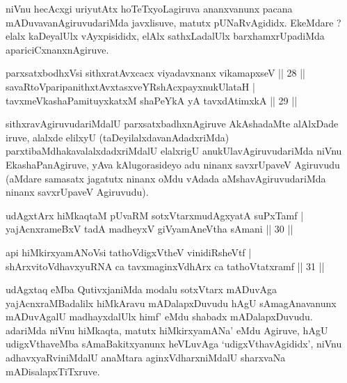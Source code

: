 \begin{artha}
niVnu hecAcxgi uriyutAtx hoTeTxyoLagiruva ananxvanunx pacana mADuvava\-nAgiruvudariMda javxlisuve, matutx pUNaRvAgididx. EkeMdare ? elalx kaDeyalUlx vAyxpisididx, elAlx sathxLadalUlx barxhamxrUpadiMda apariciCxnanxnAgiruve.
\end{artha}


\begin{shl}
parxsatxbodhxV\s si sithxratAvxcacx viyadavxnanx vikamapxseV \hfill|| 28 || \\
savaRtoV\s paripanithxtAvxtasxveYRshAcxpayxnukUlataH | \\
tavxmeVkashaPamituyxkatxM shaPeYkA yA tavxdAtimxkA \hfill|| 29 || 
\end{shl}

\begin{artha}
sithxravAgiruvudariMdalU parxsatxbadhxnAgiruve AkAshadaMte alAlxDade iruve, alalxde elilxyU (taDeyilalxdavanAdadxriMda) parxtibaMdhakavalalxdadxriMdalU elalxrigU anukUlavAgiruvudariMda niVnu EkashaPanAgiruve, yAva kAlugorasideyo adu ninanx savxrUpaveV Agiruvudu (aMdare samasatx jagatutx ninanx oMdu vAdada aMshavAgiruvudariMda ninanx savxrUpaveV Agiruvudu).
\end{artha}

\begin{shl}
udAgxtArx hiMkaqtaM pUvaRM sotxVtarxmudAgxyatA suPxTamf | \\
yajAcnxrameBxV tadA madheyxV giVyamAneV\s tha sAmani \hfill|| 30 || 
\end{shl}

\begin{shl}
api hiMkirxyamANoV\s si tathoVdigxVtheV vinidiRsheVtf | \\
shArxvitoV\s dhavxyuRNA ca tavxmaginxVdhArx ca tathoVtatxramf \hfill|| 31 || 
\end{shl}

\begin{artha}
udAgxtaq eMba QutivxjaniMda modalu sotxVtarx mADuvAga yajAcnxraMBadalilx hiMkAravu mADalapxDuvudu hAgU sAmagAnavanunx mADuvAgalU madhayxdalUlx himf' eMdu shabadx mADalapxDuvudu. adariMda niVnu hiMkaqta, matutx hiM\-kirxyamANa' eMdu Agiruve, hAgU udigxVthaveMba sAmaBakitxyanunx heVLuvAga `udigxVthavAgididx', niVnu adhavxyaRviniMdalU anaMtara aginxVdharxniMdalU sharxvaNa mADisalapxTiTxruve.
\end{artha}


